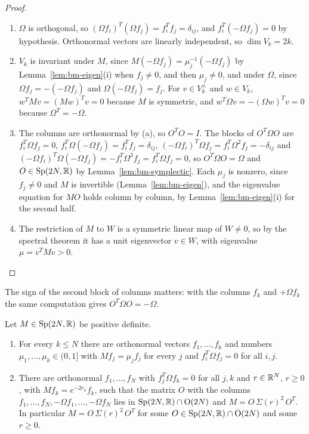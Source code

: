 \begin{vetdenv}
\begin{proof}
\begin{enumerate}
\item[(a)] $\Omega$ is orthogonal, so $(\Omega f_i)^T(\Omega f_j)=f_i^Tf_j=\delta_{ij}$, and $f_i^T(-\Omega f_j)=0$ by
hypothesis. Orthonormal vectors are linearly independent, so $\dim V_k=2k$.
\item[(b)] $V_k$ is invariant under $M$, since $M(-\Omega f_j)=\mu_j^{-1}(-\Omega f_j)$ by Lemma~\ref{lem:bm-eigen}(i)
when $f_j\ne0$, and then $\mu_j\ne0$,
and under $\Omega$, since $\Omega f_j=-(-\Omega f_j)$ and $\Omega(-\Omega f_j)=f_j$. For $v\in V_k^\perp$ and $w\in V_k$,
$w^TMv=(Mw)^Tv=0$ because $M$ is symmetric, and $w^T\Omega v=-(\Omega w)^Tv=0$ because $\Omega^T=-\Omega$.
\item[(c)] The columns are orthonormal by (a), so $O^TO=I$. The blocks of $O^T\Omega O$ are $f_i^T\Omega f_j=0$,
$f_i^T\Omega(-\Omega f_j)=f_i^Tf_j=\delta_{ij}$, $(-\Omega f_i)^T\Omega f_j=f_i^T\Omega^2f_j=-\delta_{ij}$ and
$(-\Omega f_i)^T\Omega(-\Omega f_j)=-f_i^T\Omega^3f_j=f_i^T\Omega f_j=0$, so $O^T\Omega O=\Omega$ and $O\in\mathrm{Sp}(2N,\mathbb R)$ by
Lemma~\ref{lem:bm-symplectic}. Each $\mu_j$ is nonzero, since $f_j\ne0$ and $M$ is invertible
(Lemma~\ref{lem:bm-eigen}), and the eigenvalue equation for $MO$ holds column by column, by
Lemma~\ref{lem:bm-eigen}(i) for the second half.
\item[(d)] The restriction of $M$ to $W$ is a symmetric linear map of $W\ne0$, so by the spectral theorem it has a
unit eigenvector $v\in W$, with eigenvalue $\mu=v^TMv>0$.\qedhere
\end{enumerate}
\end{proof}

The sign of the second block of columns matters: with the columns $f_k$ and $+\Omega f_k$ the same computation gives
$O^T\Omega O=-\Omega$.

\begin{theorem}\label{thm:bm-diag}
Let $M\in\mathrm{Sp}(2N,\mathbb R)$ be positive definite.
\begin{enumerate}
\item[(a)] For every $k\le N$ there are orthonormal vectors $f_1,\ldots,f_k$ and numbers $\mu_1,\ldots,\mu_k\in(0,1]$
with $Mf_j=\mu_jf_j$ for every $j$ and $f_i^T\Omega f_j=0$ for all $i,j$.
\item[(b)] There are orthonormal $f_1,\ldots,f_N$ with $f_j^T\Omega f_k=0$ for all $j,k$ and $r\in\mathbb R^N$, $r\ge0$, with
$Mf_k=e^{-2r_k}f_k$, such that the matrix $O$ with the columns $f_1,\ldots,f_N,-\Omega f_1,\ldots,-\Omega f_N$ lies in
$\mathrm{Sp}(2N,\mathbb R)\cap\mathrm{O}(2N)$ and $M=O\,\Sigma(r)^2\,O^T$. In particular $M=O\,\Sigma(r)^2\,O^T$ for some $O\in\mathrm{Sp}(2N,\mathbb R)\cap\mathrm{O}(2N)$ and some $r\ge0$.
\end{enumerate}
\end{theorem}


\end{vetdenv}
